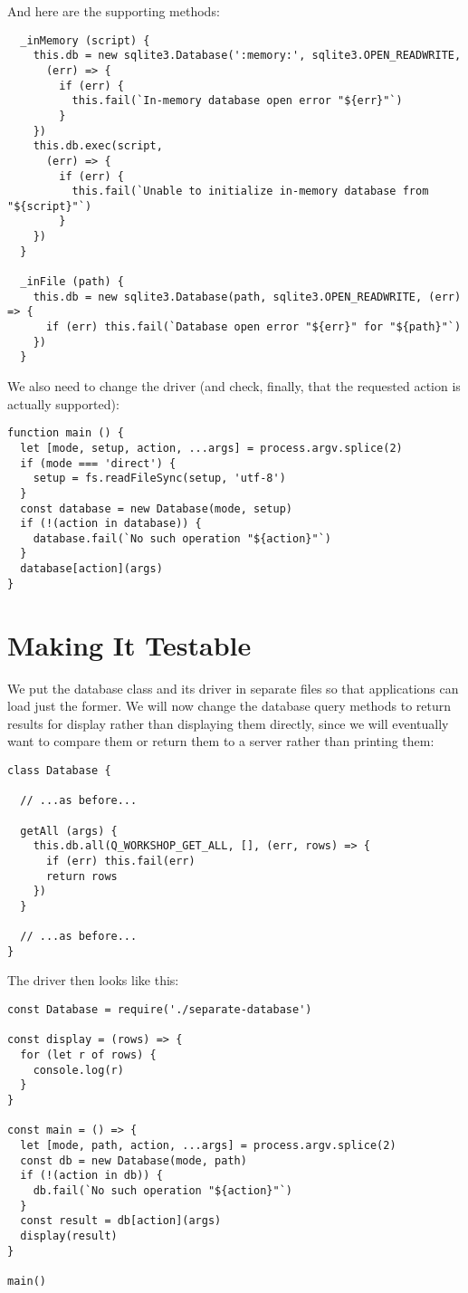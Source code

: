 And here are the supporting methods:

\begin{verbatim}
  _inMemory (script) {
    this.db = new sqlite3.Database(':memory:', sqlite3.OPEN_READWRITE,
      (err) => {
        if (err) {
          this.fail(`In-memory database open error "${err}"`)
        }
    })
    this.db.exec(script,
      (err) => {
        if (err) {
          this.fail(`Unable to initialize in-memory database from "${script}"`)
        }
    })
  }

  _inFile (path) {
    this.db = new sqlite3.Database(path, sqlite3.OPEN_READWRITE, (err) => {
      if (err) this.fail(`Database open error "${err}" for "${path}"`)
    })
  }
\end{verbatim}

We also need to change the driver
(and check, finally, that the requested action is actually supported):

\begin{verbatim}
function main () {
  let [mode, setup, action, ...args] = process.argv.splice(2)
  if (mode === 'direct') {
    setup = fs.readFileSync(setup, 'utf-8')
  }
  const database = new Database(mode, setup)
  if (!(action in database)) {
    database.fail(`No such operation "${action}"`)
  }
  database[action](args)
}
\end{verbatim}

\section{Making It Testable}\label{s:db-testable}

We put the database class and its driver in separate files
so that applications can load just the former.
We will now change the database query methods to return results for display
rather than displaying them directly,
since we will eventually want to compare them or return them to a server rather than printing them:

\begin{verbatim}
class Database {

  // ...as before...

  getAll (args) {
    this.db.all(Q_WORKSHOP_GET_ALL, [], (err, rows) => {
      if (err) this.fail(err)
      return rows
    })
  }

  // ...as before...
}
\end{verbatim}

The driver then looks like this:

\begin{verbatim}
const Database = require('./separate-database')

const display = (rows) => {
  for (let r of rows) {
    console.log(r)
  }
}

const main = () => {
  let [mode, path, action, ...args] = process.argv.splice(2)
  const db = new Database(mode, path)
  if (!(action in db)) {
    db.fail(`No such operation "${action}"`)
  }
  const result = db[action](args)
  display(result)
}

main()
\end{verbatim}

